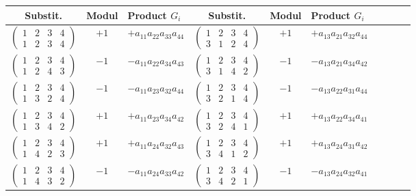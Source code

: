 \documentclass[11pt]{article}
\begin{document}
\begin{center}
\begin{tabular}{c|c|l||c|c|lcccc}
Substit. & Modul & Product $G_i$ & Substit. & Modul & Product $G_i$ \\
\hline
$\begin{pmatrix}1&2&3&4\\1&2&3&4\end{pmatrix}$ & $+1$ & $+a_{11}a_{22}a_{33}a_{44}$ & $\begin{pmatrix}1&2&3&4\\3&1&2&4\end{pmatrix}$ & $+1$ & $+a_{13}a_{21}a_{32}a_{44}$ \\
$\begin{pmatrix}1&2&3&4\\1&2&4&3\end{pmatrix}$ & $-1$ & $-a_{11}a_{22}a_{34}a_{43}$ & $\begin{pmatrix}1&2&3&4\\3&1&4&2\end{pmatrix}$ & $-1$ & $-a_{13}a_{21}a_{34}a_{42}$ \\
$\begin{pmatrix}1&2&3&4\\1&3&2&4\end{pmatrix}$ & $-1$ & $-a_{11}a_{23}a_{32}a_{44}$ & $\begin{pmatrix}1&2&3&4\\3&2&1&4\end{pmatrix}$ & $-1$ & $-a_{13}a_{22}a_{31}a_{44}$ \\
$\begin{pmatrix}1&2&3&4\\1&3&4&2\end{pmatrix}$ & $+1$ & $+a_{11}a_{23}a_{34}a_{42}$ & $\begin{pmatrix}1&2&3&4\\3&2&4&1\end{pmatrix}$ & $+1$ & $+a_{13}a_{22}a_{34}a_{41}$ \\
$\begin{pmatrix}1&2&3&4\\1&4&2&3\end{pmatrix}$ & $+1$ & $+a_{11}a_{24}a_{32}a_{43}$ & $\begin{pmatrix}1&2&3&4\\3&4&1&2\end{pmatrix}$ & $+1$ & $+a_{13}a_{24}a_{31}a_{42}$ \\
$\begin{pmatrix}1&2&3&4\\1&4&3&2\end{pmatrix}$ & $-1$ & $-a_{11}a_{24}a_{33}a_{42}$ & $\begin{pmatrix}1&2&3&4\\3&4&2&1\end{pmatrix}$ & $-1$ & $-a_{13}a_{24}a_{32}a_{41}$ \\

\end{tabular}
\end{center}
\end{document}
